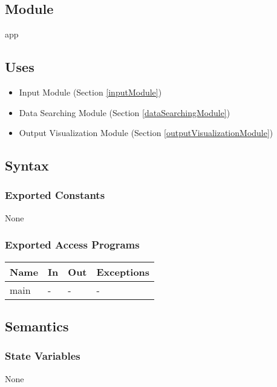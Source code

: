 \documentclass[12pt, titlepage]{article}
\begin{document}

\subsection{Module}

app

\subsection{Uses}
\begin{itemize}
\item Input Module (Section \ref{inputModule})
\item Data Searching Module (Section \ref{dataSearchingModule})
\item Output Visualization Module (Section \ref{outputVisualizationModule})
\end{itemize}


\subsection{Syntax}

\subsubsection{Exported Constants}

None

\subsubsection{Exported Access Programs}

\begin{center}
\begin{tabular}{p{2cm} p{5cm} p{4cm} p{2cm}}
\hline
\textbf{Name} & \textbf{In} & \textbf{Out} & \textbf{Exceptions} \\
\hline
main & -  & - & - \\
\hline
\end{tabular}
\end{center}

\subsection{Semantics}

\subsubsection{State Variables}
None
\end{document}
